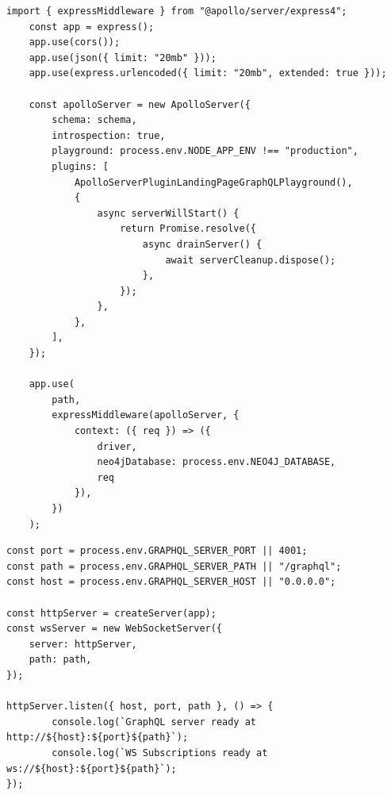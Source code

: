 \begin{lstlisting}
import { expressMiddleware } from "@apollo/server/express4";
    const app = express();
    app.use(cors());
    app.use(json({ limit: "20mb" }));
    app.use(express.urlencoded({ limit: "20mb", extended: true }));
    
	const apolloServer = new ApolloServer({
		schema: schema,
		introspection: true,
		playground: process.env.NODE_APP_ENV !== "production",
		plugins: [
			ApolloServerPluginLandingPageGraphQLPlayground(),
			{
				async serverWillStart() {
					return Promise.resolve({
						async drainServer() {
							await serverCleanup.dispose();
						},
					});
				},
			},
		],
	});

	app.use(
		path,
		expressMiddleware(apolloServer, {
			context: ({ req }) => ({
				driver,
				neo4jDatabase: process.env.NEO4J_DATABASE,
				req
			}),
		})
	);
\end{lstlisting}


\begin{lstlisting}
const port = process.env.GRAPHQL_SERVER_PORT || 4001;
const path = process.env.GRAPHQL_SERVER_PATH || "/graphql";
const host = process.env.GRAPHQL_SERVER_HOST || "0.0.0.0";

const httpServer = createServer(app);
const wsServer = new WebSocketServer({
	server: httpServer,
	path: path,
});

httpServer.listen({ host, port, path }, () => {
		console.log(`GraphQL server ready at http://${host}:${port}${path}`);
		console.log(`WS Subscriptions ready at ws://${host}:${port}${path}`);
});


\end{lstlisting}



